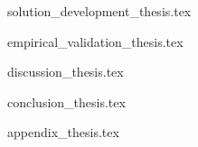 \documentclass[11pt,a4paper]{report}
\begin{document}
{solution_development_thesis.tex}

{empirical_validation_thesis.tex}

{discussion_thesis.tex}

{conclusion_thesis.tex}




\renewcommand{\bibname}{References}


\renewcommand{\bibname}{Systematic Literature Review References}

\appendix
{appendix_thesis.tex}

\PrintIndex
\end{document}
